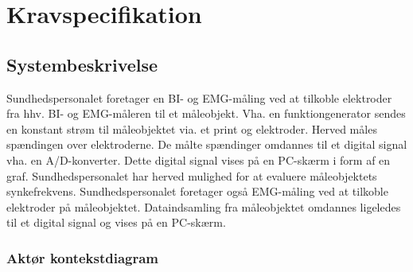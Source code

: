 \chapter{Kravspecifikation}
%
%    





\section{Systembeskrivelse}
Sundhedspersonalet foretager en BI- og EMG-måling ved at tilkoble elektroder fra hhv. BI- og EMG-måleren til et måleobjekt. Vha. en funktiongenerator sendes en konstant strøm til måleobjektet via. et print og elektroder. Herved måles spændingen over elektroderne. De målte spændinger omdannes til et digital signal vha. en A/D-konverter. Dette digital signal vises på en PC-skærm i form af en graf. Sundhedspersonalet har herved mulighed for at evaluere måleobjektets synkefrekvens. Sundhedspersonalet foretager også EMG-måling ved at tilkoble elektroder på måleobjektet. Dataindsamling fra måleobjektet omdannes ligeledes til et digital signal og vises på en PC-skærm.      
\subsection{Aktør kontekstdiagram}

